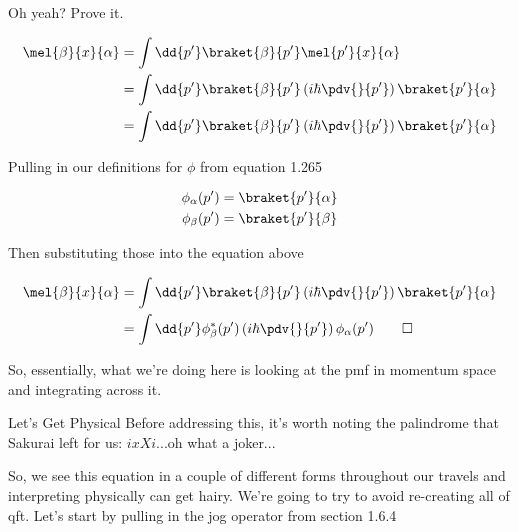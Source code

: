 \begin{answer}
\begin{answerpart}{Oh yeah?  Prove it.}
\begin{answerspart}
      \begin{equation}
        \begin{split}
          \mel{\beta}{x}{\alpha}
          &= \int \dd{p'} \braket{\beta}{p'}\mel{p'}{x}{\alpha}\\
          &= \int \dd{p'} \braket{\beta}{p'}\left(i\hbar \pdv{}{p'}\right)\braket{p'}{\alpha}\\
          &= \int \dd{p'} \braket{\beta}{p'}\left(i\hbar \pdv{}{p'}\right)\braket{p'}{\alpha}\\
        \end{split}
      \end{equation}

      Pulling in our definitions for $\phi$ from equation 1.265

      \begin{equation}
        \begin{split}
          \phi_{\alpha}(p') &= \braket{p'}{\alpha}\\
          \phi_{\beta}(p') &= \braket{p'}{\beta}\\
        \end{split}
      \end{equation}

      Then substituting those into the equation above

      \begin{equation}
        \begin{split}
          \mel{\beta}{x}{\alpha}
          &= \int \dd{p'} \braket{\beta}{p'}\left(i\hbar \pdv{}{p'}\right)\braket{p'}{\alpha}\\          
          &= \int \dd{p'} \phi_{\beta}^{*}(p')
          \left(i\hbar \pdv{}{p'}\right)
          \phi_{\alpha}(p')\qed\\
        \end{split}
      \end{equation}

      So, essentially, what we're doing here is looking at the
      \ac{pmf} in momentum space and integrating across it.
    \end{answerspart}
  \end{answerpart}

  \begin{answerpart}{Let's Get Physical}
    Before addressing this, it's worth noting the palindrome that
    Sakurai left for us: $ix Xi$...oh what a joker...

    So, we see this equation in a couple of different forms throughout
    our travels and interpreting physically can get hairy.  We're
    going to try to avoid re-creating all of \ac{qft}.  Let's start by
    pulling in the jog operator from section 1.6.4


\end{answerpart}
\end{answer}

